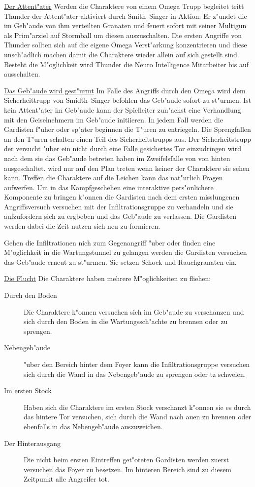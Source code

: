 \underline{Der Attent"ater} Werden die Charaktere von einem Omega Trupp begleitet tritt Thunder der Attent"ater aktiviert durch 
Smith--Singer in Aktion. Er z"undet die im Geb"aude von ihm verteilten Granaten und feuert sofort mit seiner Multigun als Prim"arziel auf Stormball um diesen auszuschalten. Die ersten Angriffe von Thunder sollten sich auf die eigene Omega Verst"arkung konzentrieren und diese
unsch"adlich machen damit die Charaktere wieder allein auf sich gestellt sind. Besteht die M"oglichkeit wird Thunder die Neuro Intelligence Mitarbeiter bis auf \ml{} ausschalten.

\underline{Das Geb"aude wird gest"urmt} Im Falle des Angriffs durch den Omega wird dem Sicherheittrupp von Smidth--Singer befohlen das Geb"aude sofort zu st"urmen. Ist kein Attent"ater im Geb"aude kann der Spielleiter zun"achst eine Verhandlung mit den Geiselnehmern im Geb"aude initiieren. In jedem Fall werden die Gardisten f"uher oder sp"ater beginnen die T"uren zu entriegeln. Die Sprengfallen an den T"uren schalten einen Teil des Sicherheitstrupps aus. Der Sicherheitstrupp der versucht "uber ein nicht durch eine Falle gesichertes Tor einzudringen wird nach dem sie das Geb"aude betreten haben im Zweifelsfalle von \xl{} von hinten ausgeschaltet. \xl{} wird nur auf den Plan treten wenn keiner der Charaktere sie sehen kann. Treffen die Charaktere auf die Leichen kann das nat"urlich Fragen aufwerfen. Um in das Kampfgeschehen eine interaktive pers"onlichere Komponente zu bringen k"onnen die Gardisten nach dem ersten misslungenen Angriffsversuch versuchen mit der Infiltrationsgruppe zu verhandeln und sie aufzufordern sich zu ergbeben und das Geb"aude zu verlassen. Die Gardisten werden dabei die Zeit nutzen sich neu zu formieren.

Gehen die Infiltrationen nich zum Gegenangriff "uber oder finden eine M"oglichkeit in die Wartungstunnel zu gelangen werden die Gardisten versuchen das Geb"aude erneut zu st"urmen. Sie setzen Schock und Rauchgranaten ein.

\underline{Die Flucht} Die Charaktere haben mehrere M"oglichkeiten zu fliehen:

\begin{description}
	\item [Durch den Boden] Die Charaktere k"onnen versuchen sich im Geb"aude zu verschanzen und sich durch den Boden in die 		
		Wartungssch"achte zu brennen oder zu sprengen.
	\item [Nebengeb"aude] "uber den Bereich hinter dem Foyer kann die Infiltrationsgruppe versuchen sich durch die Wand in das 		
		Nebengeb"aude zu sprengen oder tz schwei\3en.
	\item [Im ersten Stock] Haben sich die Charaktere im ersten Stock verschanzt k"onnen sie es durch das hintere Tor versuchen, 
		  sich 	durch die Wand nach au\3en zu brennen oder ebenfalls in das Nebengeb"aude auszuweichen.
	\item [Der Hinterausgang] Die nicht beim ersten Eintreffen get"oteten Gardisten werden zuerst versuchen das Foyer zu besetzen. Im hinteren Bereich sind zu diesem Zeitpunkt alle Angreifer tot.	
\end{description}

